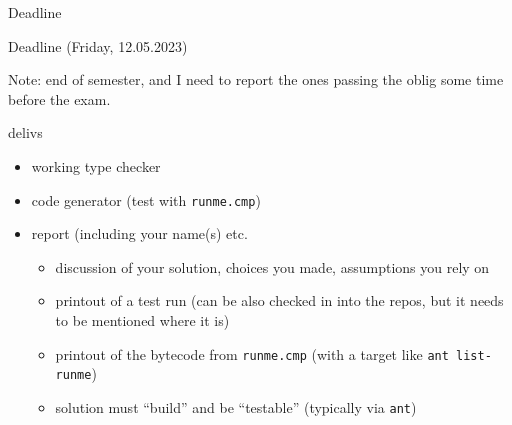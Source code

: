 \documentclass{beamer}
\begin{document}
\begin{frame}[label={sec:org06b5a5a},fragile]{Deadline}
 \begin{alertblock}{Deadline}
(Friday, 12.05.2023)
\end{alertblock}


Note: end of semester, and I need to report the ones passing the oblig some
time before the exam.


\begin{block}{delivs}
\begin{itemize}
\item working type checker
\item code generator (test with \texttt{runme.cmp})
\item report (including your name(s) etc.

\begin{itemize}
\item discussion of your solution, choices you made, assumptions you rely on

\item printout of a test run (can be also checked in into the repos, but it 
needs to be mentioned where it is)
\item printout of the bytecode from \texttt{runme.cmp} (with a target like \texttt{ant
    list-runme})

\item solution must ``build'' and be ``testable'' (typically via \texttt{ant})
\end{itemize}
\end{itemize}
\end{block}
\end{frame}







\end{document}
